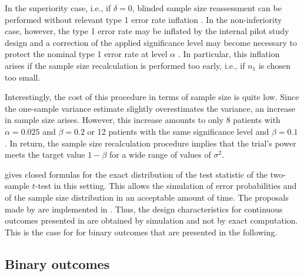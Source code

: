In the superiority case, i.e., if \(\delta=0\), blinded sample size
reassessment can be performed without relevant type 1 error rate
inflation \citep{KF2003}. In the non-inferiority case, however, the type
1 error rate may be inflated by the internal pilot study design and a
correction of the applied significance level may become necessary to
protect the nominal type 1 error rate at level \(\alpha\)
\citep{FK2003}. In particular, this inflation arises if the sample size
recalculation is performed too early, i.e., if \(n_1\) is chosen too
small.

Interestingly, the cost of this procedure in terms of sample size is
quite low. Since the one-sample variance estimate slightly overestimates
the variance, an increase in sample size arises. However, this increase
amounts to only 8 patients with \(\alpha = 0.025\) and \(\beta = 0.2\)
or 12 patients with the same significance level and \(\beta = 0.1\)
\citep{FK2001}. In return, the sample size recalculation procedure
implies that the trial's power meets the target value \(1-\beta\) for a
wide range of values of \(\sigma^2\).

\citet{Lu2016} gives closed formulas for the exact distribution of the
test statistic of the two-sample \(t\)-test in this setting. This allows
the simulation of error probabilities and of the sample size
distribution in an acceptable amount of time. The proposals made by
\citet{Lu2016} are implemented in . Thus, the design
characteristics for continuous outcomes presented in 
are obtained by simulation and not by exact computation. This is the
case for for binary outcomes that are presented in the following.

\hypertarget{binary-outcomes}{%
\subsection{Binary outcomes}\label{binary-outcomes}}

